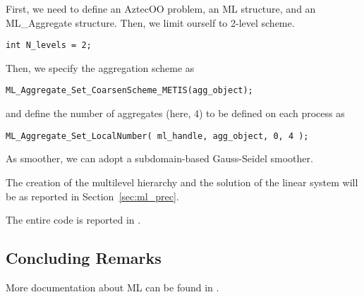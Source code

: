First, we need to define an AztecOO problem, an ML structure, and an
ML\_Aggregate structure. Then, we limit ourself to 2-level scheme.
\begin{verbatim}
int N_levels = 2;
\end{verbatim}
Then, we specify the aggregation scheme as
\begin{verbatim}
ML_Aggregate_Set_CoarsenScheme_METIS(agg_object);
\end{verbatim}
and define the number of aggregates (here, 4) to be defined on each
process as
\begin{verbatim}
ML_Aggregate_Set_LocalNumber( ml_handle, agg_object, 0, 4 );
\end{verbatim}

As smoother, we can adopt a subdomain-based Gauss-Seidel smoother.

The creation of the multilevel hierarchy and the solution of the linear
system will be as reported in Section~\ref{sec:ml_prec}.

The entire code is reported in .


\subsection{Concluding Remarks}
\label{sec:ml_concluding}

More documentation about ML can be found in
\cite{ML-home-page,TuminaroTong:00,TuminaroTong:00}.

